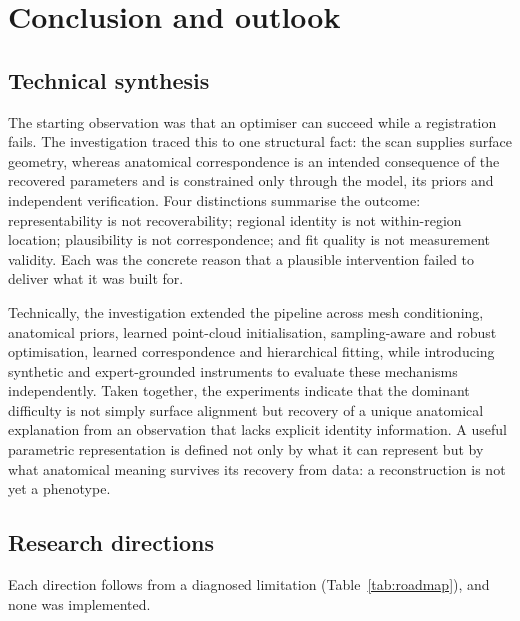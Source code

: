 \section{Conclusion and outlook}
\label{sec:conclusion}

\subsection{Technical synthesis}

The starting observation was that an optimiser can succeed while a registration
fails. The investigation traced this to one structural fact: the scan supplies
surface geometry, whereas anatomical correspondence is an intended consequence of
the recovered parameters and is constrained only through the model, its priors and
independent verification. Four distinctions summarise the
outcome: representability is not recoverability; regional identity is not
within-region location; plausibility is not correspondence; and fit quality is not
measurement validity. Each was the concrete reason that a plausible intervention
failed to deliver what it was built for.

Technically, the investigation extended the pipeline across mesh conditioning,
anatomical priors, learned point-cloud initialisation, sampling-aware and robust
optimisation, learned correspondence and hierarchical fitting, while introducing
synthetic and expert-grounded instruments to evaluate these mechanisms
independently. Taken together, the experiments indicate that the dominant
difficulty is not simply surface alignment but recovery of a unique anatomical
explanation from an observation that lacks explicit identity information. A useful
parametric representation is defined not only by what it can represent but by what
anatomical meaning survives its recovery from data: a reconstruction is not yet a
phenotype.

\subsection{Research directions}

Each direction follows from a diagnosed limitation (Table~\ref{tab:roadmap}), and
none was implemented.

